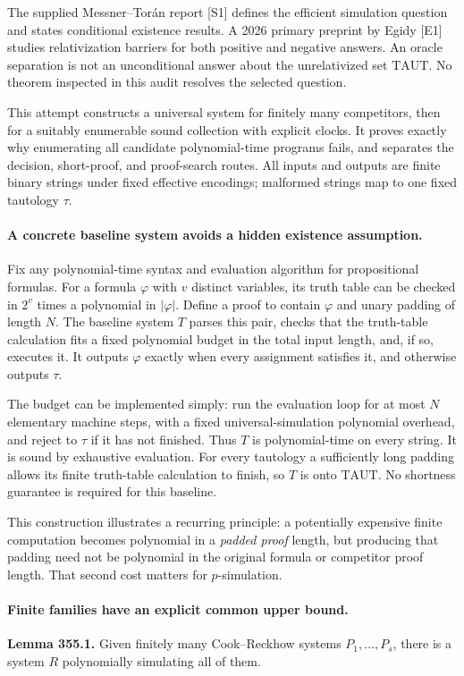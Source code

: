 \documentclass[11pt]{article}
\begin{document}
The supplied Messner--Tor\'an report [S1] defines the efficient simulation
question and states conditional existence results. A 2026 primary
preprint by Egidy [E1] studies relativization barriers for both positive
and negative answers. An oracle separation is not an unconditional
answer about the unrelativized set $\mathrm{TAUT}$. No theorem inspected
in this audit resolves the selected question.

This attempt constructs a universal system for finitely many competitors,
then for a suitably enumerable sound collection with explicit clocks.
It proves exactly why enumerating all candidate polynomial-time programs
fails, and separates the decision, short-proof, and proof-search routes.
All inputs and outputs are finite binary strings under fixed effective
encodings; malformed strings map to one fixed tautology $\tau$.

\paragraph{A concrete baseline system avoids a hidden existence assumption.}
Fix any polynomial-time syntax and evaluation algorithm for propositional
formulas. For a formula $\varphi$ with $v$ distinct variables, its truth
table can be checked in $2^v$ times a polynomial in $|\varphi|$.
Define a proof to contain $\varphi$ and unary padding of length $N$.
The baseline system $T$ parses this pair, checks that the truth-table
calculation fits a fixed polynomial budget in the total input length,
and, if so, executes it. It outputs $\varphi$ exactly when every
assignment satisfies it, and otherwise outputs $\tau$.

The budget can be implemented simply: run the evaluation loop for at
most $N$ elementary machine steps, with a fixed universal-simulation
polynomial overhead, and reject to $\tau$ if it has not finished.
Thus $T$ is polynomial-time on every string. It is sound by exhaustive
evaluation. For every tautology a sufficiently long padding allows its
finite truth-table calculation to finish, so $T$ is onto $\mathrm{TAUT}$.
No shortness guarantee is required for this baseline.

This construction illustrates a recurring principle: a potentially
expensive finite computation becomes polynomial in a \emph{padded proof}
length, but producing that padding need not be polynomial in the original
formula or competitor proof length. That second cost matters for
$p$-simulation.

\paragraph{Finite families have an explicit common upper bound.}
\textbf{Lemma 355.1.} Given finitely many Cook--Reckhow systems
$P_1,\ldots,P_s$, there is a system $R$ polynomially simulating all
of them.
\end{document}
